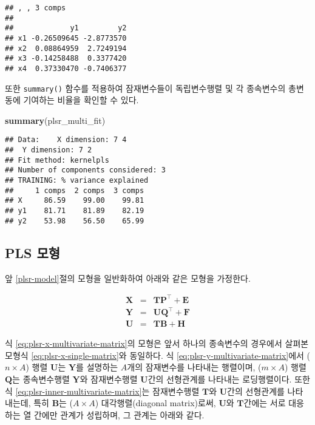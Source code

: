 \documentclass[]{book}
\newenvironment{Shaded}{\begin{snugshade}}{\end{snugshade}}
\newcommand{\KeywordTok}[1]{\textcolor[rgb]{0.13,0.29,0.53}{\textbf{#1}}}
\newcommand{\NormalTok}[1]{#1}
\begin{document}
\begin{verbatim}
## , , 3 comps
## 
##             y1         y2
## x1 -0.26509645 -2.8773570
## x2  0.08864959  2.7249194
## x3 -0.14258488  0.3377420
## x4  0.37330470 -0.7406377
\end{verbatim}

또한 \texttt{summary()} 함수를 적용하여 잠재변수들이 독립변수행렬 및 각 종속변수의 총변동에 기여하는 비율을 확인할 수 있다.

\begin{Shaded}
\begin{Highlighting}[]
\KeywordTok{summary}\NormalTok{(plsr_multi_fit)}
\end{Highlighting}
\end{Shaded}

\begin{verbatim}
## Data:    X dimension: 7 4 
##  Y dimension: 7 2
## Fit method: kernelpls
## Number of components considered: 3
## TRAINING: % variance explained
##     1 comps  2 comps  3 comps
## X     86.59    99.00    99.81
## y1    81.71    81.89    82.19
## y2    53.98    56.50    65.99
\end{verbatim}

\hypertarget{plsr-multivariate-model}{%
\subsection{PLS 모형}\label{plsr-multivariate-model}}

앞 \ref{plsr-model}절의 모형을 일반화하여 아래와 같은 모형을 가정한다.

\begin{eqnarray}
\mathbf{X} &=& \mathbf{T} \mathbf{P}^\top + \mathbf{E} \label{eq:plsr-x-multivariate-matrix}\\
\mathbf{Y} &=& \mathbf{U} \mathbf{Q}^\top + \mathbf{F} \label{eq:plsr-y-multivariate-matrix}\\
\mathbf{U} &=& \mathbf{T} \mathbf{B} + \mathbf{H}  \label{eq:plsr-inner-multivariate-matrix}
\end{eqnarray}

식 \eqref{eq:plsr-x-multivariate-matrix}의 모형은 앞서 하나의 종속변수의 경우에서 살펴본 모형식 \eqref{eq:plsr-x-single-matrix}와 동일하다. 식 \eqref{eq:plsr-y-multivariate-matrix}에서 (\(n \times A\)) 행렬 \(\mathbf{U}\)는 \(\mathbf{Y}\)를 설명하는 \(A\)개의 잠재변수를 나타내는 행렬이며, (\(m \times A\)) 행렬 \(\mathbf{Q}\)는 종속변수행렬 \(\mathbf{Y}\)와 잠재변수행렬 \(\mathbf{U}\)간의 선형관계를 나타내는 로딩행렬이다. 또한 식 \eqref{eq:plsr-inner-multivariate-matrix}는 잠재변수행렬 \(\mathbf{T}\)와 \(\mathbf{U}\)간의 선형관계를 나타내는데, 특히 \(\mathbf{B}\)는 (\(A \times A\)) 대각행렬(diagonal matrix)로써, \(\mathbf{U}\)와 \(\mathbf{T}\)간에는 서로 대응하는 열 간에만 관계가 성립하며, 그 관계는 아래와 같다.
\end{document}
